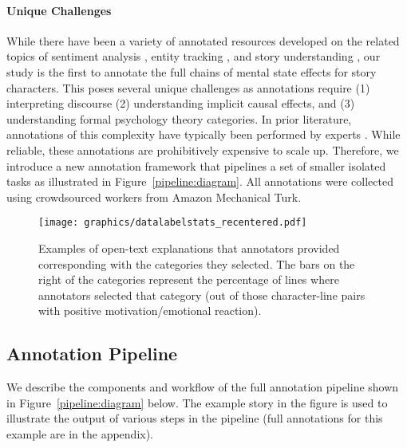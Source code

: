 \documentclass[11pt,a4paper]{article}
\begin{document}
\paragraph{Unique Challenges} 
While there have been a variety of annotated resources developed on the related topics of sentiment analysis \cite{MohammadEmoLex,deng2015mpqa}, entity tracking \cite{Hoffart2011RobustDO,babi}, and story understanding \cite{Goyal2010AutomaticallyPP,Ouyang2015ModelingRE,Lukin2016PersonaBankAC}, our study is the first to annotate the full chains of mental state effects for story characters.  This poses several unique challenges as annotations require (1) interpreting discourse (2) understanding implicit causal effects, and (3) understanding formal psychology theory categories. 
In prior literature, annotations of this complexity have typically been performed by experts \cite{deng2015mpqa,Ouyang2015ModelingRE}. While reliable, these annotations are prohibitively expensive to scale up. Therefore, we introduce a new annotation framework that pipelines a set of smaller isolated tasks as illustrated in Figure~\ref{pipeline:diagram}.  All annotations were collected using crowdsourced workers from Amazon Mechanical Turk.
\begin{figure*}[tb]
  \centering
  \texttt{[image: graphics/datalabelstats\_recentered.pdf]}
 \vspace*{-8mm}
\caption{Examples of open-text explanations that annotators provided corresponding with the categories they selected.  The bars on the right of the categories represent the percentage of lines where annotators selected that category (out of those character-line pairs with positive motivation/emotional reaction).}
\label{lbldistrib}
\end{figure*}












\subsection{Annotation Pipeline}



We describe the components and workflow of the full annotation pipeline shown in Figure~\ref{pipeline:diagram} below. The example story in the figure is used to illustrate the output of various steps in the pipeline (full annotations for this example are in the appendix). 
\end{document}
